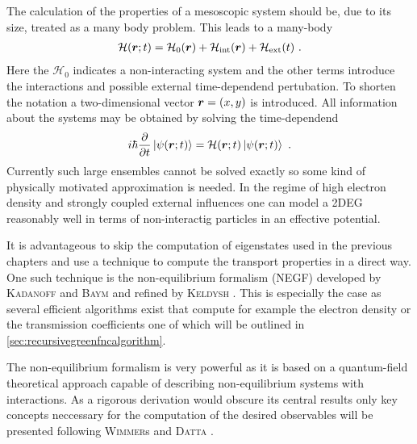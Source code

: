 The calculation of the properties of a mesoscopic system should be, due to its size, treated as a many body problem. This leads to a many-body \hamil{}
\begin{align}
\mathcal{H}(\boldsymbol{r};t) = \mathcal{H}_0(\boldsymbol{r}) + \mathcal{H}_{\text{int}}(\boldsymbol{r})+\mathcal{H}_{\text{ext}}(t)\ .
\end{align}
Here the $\mathcal{H}_0$ indicates a non-interacting system and the other terms introduce the interactions and possible external time-dependend pertubation. To shorten the notation a two-dimensional vector $\boldsymbol{r}=(x,y)$ is introduced.  
All information about the systems may be obtained by solving the time-dependend \sdg{}
\begin{align}
i\hbar \frac{\partial }{\partial t} \left| \psi(\boldsymbol{r};t) \right> = \mathcal{H}(\boldsymbol{r};t) \left| \psi(\boldsymbol{r};t) \right>\ .
\label{eqn:timedependendsdg}
\end{align}
Currently such large ensembles cannot be solved exactly so some kind of physically motivated approximation is needed. In the regime of high electron density and strongly coupled external influences one can model a 2DEG reasonably well in terms of non-interactig particles in an effective potential\cite{fetter2003quantum}. \par
It is advantageous to skip the computation of eigenstates used in the previous chapters and use a technique to compute the transport properties in a direct way. One such technique is the non-equilibrium \gfnc{} formalism (NEGF) developed by \textsc{Kadanoff} and \textsc{Baym} \cite{kadanoff1962quantum} and refined by \textsc{Keldysh} \cite{keldysh1965}. This is especially the case as several efficient algorithms exist that compute for example the electron density or the transmission coefficients one of which will be outlined in \cref{sec:recursivegreenfncalgorithm}.\par
The non-equilibrium \gfnc{} formalism is very powerful as it is based on a quantum-field theoretical approach capable of describing non-equilibrium systems with interactions. As a rigorous derivation would obscure its central results only key concepts neccessary for the computation of the desired observables will be presented following \textsc{Wimmer}s \cite{Wimmer2009Thesis} and \textsc{Datta} \cite{Datta1997}.\par
